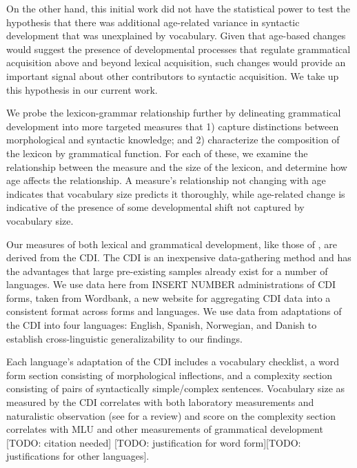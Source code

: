 \documentclass[10pt,letterpaper]{article}
\begin{document}
On the other hand, this initial work did not have the statistical power to test the hypothesis that there was additional age-related variance in syntactic development that was unexplained by vocabulary. Given that age-based changes would suggest the presence of developmental processes that regulate grammatical acquisition above and beyond lexical acquisition, such changes would provide an important signal about other contributors to syntactic acquisition. We take up this hypothesis in our current work. 

We probe the lexicon-grammar relationship further by delineating grammatical development into more targeted measures that 1) capture distinctions between morphological and syntactic knowledge; and 2) characterize the composition of the lexicon by grammatical function. For each of these, we examine the relationship between the measure and the size of the lexicon, and determine how age affects the relationship. A measure's relationship not changing with age indicates that vocabulary size predicts it thoroughly, while age-related change is indicative of the presence of some developmental shift not captured by vocabulary size.

Our measures of both lexical and grammatical development, like those of \citeauthor{bates1994}, are derived from the CDI. The CDI is an inexpensive data-gathering method and has the advantages that large pre-existing samples already exist for a number of languages. We use data here from INSERT NUMBER administrations of CDI forms, taken from Wordbank, a new website for aggregating CDI data into a consistent format across forms and languages. We use data from adaptations of the CDI into four languages: English, Spanish, Norwegian, and Danish to establish cross-linguistic generalizability to our findings.

Each language's adaptation of the CDI includes a vocabulary checklist, a word form section consisting of morphological inflections, and a complexity section consisting of pairs of syntactically simple/complex sentences. Vocabulary size as measured by the CDI correlates with both laboratory measurements and naturalistic observation (see \cite{fenson2007} for a review) and score on the complexity section correlates with MLU and other measurements of grammatical development [TODO: citation needed] [TODO: justification for word form][TODO: justifications for other languages].

\end{document}

